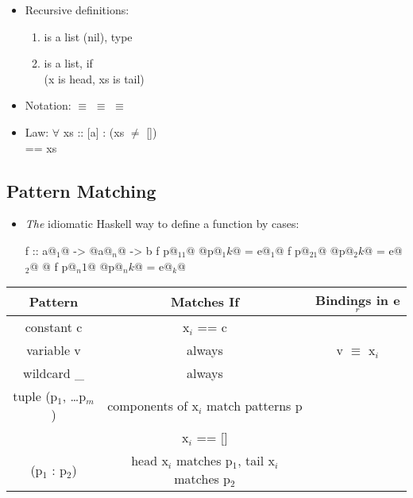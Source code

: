 \begin{itemize}
  \item Recursive definitions:
  \begin{enumerate}
      \item \codeline{[]} is a list (nil), type \codeline{[] :: [a]}
      \item {} is a list, if \\
      (x is head, xs is tail)
  \end{enumerate}
  \item Notation:  $\equiv$  $\equiv$ \codeline{[3,2,1]} $\equiv$ 
  \item Law: $\forall$ xs :: [a] :   \hspace{1cm} (xs $\neq$ []) \\
       == xs
\end{itemize}

\subsection{Pattern Matching}

\begin{itemize}
  \item \textit{The} idiomatic Haskell way to define a function by cases:\\
  \begin{Haskell}
f :: a@$_1$@ -> @\dots@ a@$_n$@ -> b
f p@$_11$@ @\dots@ p@$_1k$@ = e@$_1$@
f p@$_21$@ @\dots@ p@$_2k$@ = e@$_2$@
@\dots@
f p@$_n1$@ @\dots@ p@$_nk$@ = e@$_k$@
  \end{Haskell}

\end{itemize}

\vspace{9pt}\begin{center}\begin{tabular}{|c|c|c|}\hline
\rowcolor{grau}   
Pattern         & Matches If                & Bindings in e$_r$     \\\hline
  constant c      & x$_i$ == c                  &                     \\\hline
  variable v      & always                    & v $\equiv$ x$_i$      \\\hline
  wildcard \_      & always                    &                       \\\hline
  tuple (p$_1$, \dots p$_m$)  & components of x$_i$ match patterns p    & \\\hline
  []              & x$_i$ == []                 &                     \\\hline
  (p$_1$ : p$_2$)     & head x$_i$ matches p$_1$, tail x$_i$ matches p$_2$    & \\\hline
\end{tabular}\end{center}\vspace{9pt}

